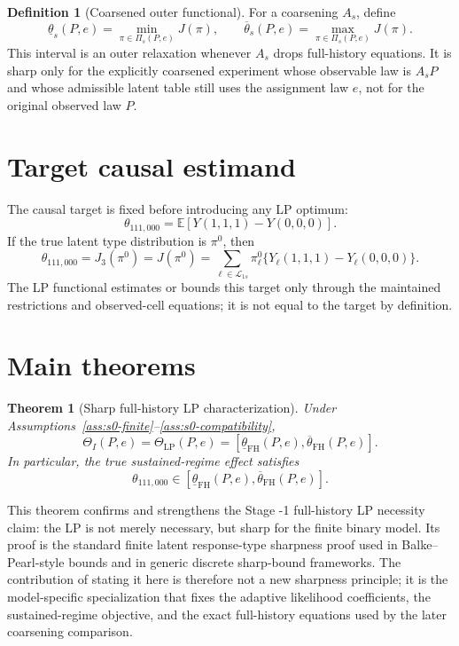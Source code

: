 \documentclass[11pt]{article}
\newcommand{\E}{\mathbb{E}}
\theoremstyle{definition}
\newtheorem{definition}{Definition}
\theoremstyle{plain}
\newtheorem{theorem}{Theorem}
\theoremstyle{remark}
\begin{document}
\begin{definition}[Coarsened outer functional]\label{def:s0-coarse-lp}
For a coarsening \(A_s\), define
\[
\underline\theta_s(P,e)=\min_{\pi\in\Pi_s(P,e)}J(\pi),
\qquad
\overline\theta_s(P,e)=\max_{\pi\in\Pi_s(P,e)}J(\pi).
\]
This interval is an outer relaxation whenever \(A_s\) drops full-history equations.  It is sharp only for the explicitly coarsened experiment whose observable law is \(A_sP\) and whose admissible latent table still uses the assignment law \(e\), not for the original observed law \(P\).
\end{definition}

\section{Target causal estimand}
The causal target is fixed before introducing any LP optimum:
\[
\theta_{111,000}
=\E[Y(1,1,1)-Y(0,0,0)].
\]
If the true latent type distribution is \(\pi^0\), then
\[
\theta_{111,000}=J_3(\pi^0)=J(\pi^0)
=
\sum_{\ell\in\mathcal L_{1s}}\pi^0_\ell
\{Y_\ell(1,1,1)-Y_\ell(0,0,0)\}.
\]
The LP functional estimates or bounds this target only through the maintained restrictions and observed-cell equations; it is not equal to the target by definition.

\section{Main theorems}
\begin{theorem}[Sharp full-history LP characterization]\label{thm:s0-sharp-lp}
Under Assumptions~\ref{ass:s0-finite}--\ref{ass:s0-compatibility},
\[
\Theta_I(P,e)=\Theta_{\mathrm{LP}}(P,e)=
[\underline\theta_{\mathrm{FH}}(P,e),\overline\theta_{\mathrm{FH}}(P,e)].
\]
In particular, the true sustained-regime effect satisfies
\[
\theta_{111,000}\in
[\underline\theta_{\mathrm{FH}}(P,e),\overline\theta_{\mathrm{FH}}(P,e)].
\]
\end{theorem}

This theorem confirms and strengthens the Stage -1 full-history LP necessity claim: the LP is not merely necessary, but sharp for the finite binary model.  Its proof is the standard finite latent response-type sharpness proof used in Balke--Pearl-style bounds and in generic discrete sharp-bound frameworks.  The contribution of stating it here is therefore not a new sharpness principle; it is the model-specific specialization that fixes the adaptive likelihood coefficients, the sustained-regime objective, and the exact full-history equations used by the later coarsening comparison.
\end{document}
